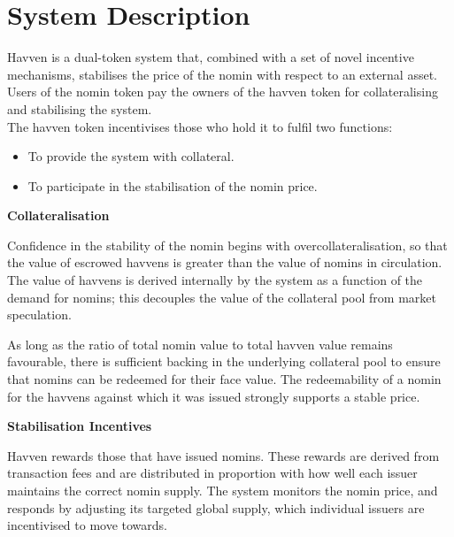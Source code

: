 \section{System Description} Havven is a dual-token system that, combined with a set of novel incentive mechanisms, stabilises the price of the nomin with respect to an external asset. Users of the nomin token pay the owners of the havven token for collateralising and stabilising the system. \\

\noindent The havven token incentivises those who hold it to fulfil two functions:

\begin{itemize}
\item{To provide the system with collateral.}
\item{To participate in the stabilisation of the nomin price.}
\end{itemize}

\vspace{2mm}

\noindent \textbf{Collateralisation}
\vspace{2mm}

\noindent Confidence in the stability of the nomin begins with overcollateralisation, so that the value of escrowed havvens is greater than the value of nomins in circulation. The value of havvens is derived internally by the system as a function of the demand for nomins; this decouples the value of the collateral pool from market speculation.

\vspace{2mm}

\noindent As long as the ratio of total nomin value to total havven value remains favourable,
there is sufficient backing in the underlying collateral pool to ensure that nomins
can be redeemed for their face value. The redeemability of a nomin for the havvens
against which it was issued strongly supports a stable price. \\

\vspace{2mm}

\noindent \textbf{Stabilisation Incentives}
\vspace{2mm}

\noindent Havven rewards those that have issued nomins. These rewards are derived from transaction fees and are distributed in proportion with how well each issuer maintains the correct nomin supply. The system monitors the nomin price, and responds by adjusting its targeted global supply, which individual issuers are incentivised to move towards.

